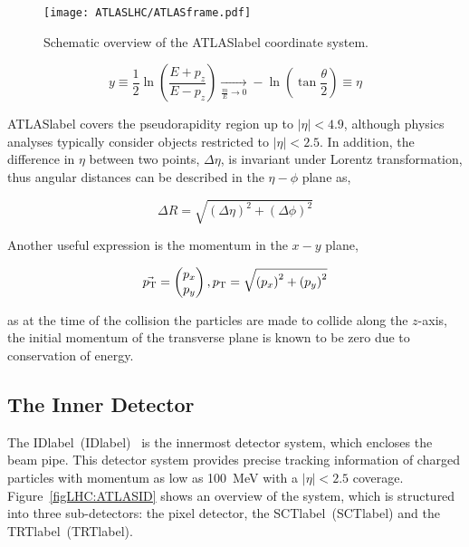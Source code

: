 \begin{figure}[htbp]
    \RawFloats
    \begin{center}
    \texttt{[image: ATLASLHC/ATLASframe.pdf]}
    \caption{
        Schematic overview of the \acrshort{ATLASlabel} coordinate system. 
    }
    \label{figLHC:ATLASframe}
    \end{center}
\end{figure}

\begin{equation}
   y \equiv \frac{1}{2}\ln\left(\frac{E+p_z}{E-p_z}\right) \xrightarrow[ \frac{m}{E} \to 0]{} -\ln\left(\tan\frac{\theta}{2}\right)\equiv \eta
\end{equation}

\acrshort{ATLASlabel} covers the pseudorapidity region up to $|\eta|<4.9$, although physics analyses
typically consider objects restricted to $|\eta|<2.5$. In addition, the difference in $\eta$ between two points, $\Delta\eta$, is invariant under Lorentz transformation, thus angular distances can be described in the $\eta-\phi$ plane as,

\begin{equation}
    \Delta R = \sqrt{\left(\Delta\eta\right)^2+\left(\Delta\phi\right)^2}
\end{equation}

Another useful expression is the momentum in the $x-y$ plane, 

\begin{equation}
    \vec{p_{\text{T}}} = \begin{pmatrix} p_x \\ p_y \end{pmatrix}, p_{\text{T}} = \sqrt{\left(p_x\right)^2+\left(p_y\right)^2}
\end{equation}

as at the time of the collision the particles are made to collide along the $z$-axis, the initial momentum of the transverse plane is known to be zero due to conservation of energy.

\subsection{The Inner Detector}

The \acrlong{IDlabel}~(\acrshort{IDlabel})~\cite{CERN-LHCC-97-016,Haywood:331064,Pixelupgrade} is the innermost detector system, which encloses the beam pipe. This detector system provides precise tracking information of charged particles with momentum as low as 100~MeV with a $|\eta|<2.5$ coverage. Figure~\ref{figLHC:ATLASID} shows an overview of the system, which is structured into three sub-detectors: the pixel detector, the \acrlong{SCTlabel}~(\acrshort{SCTlabel}) and the \acrlong{TRTlabel}~(\acrshort{TRTlabel}).


